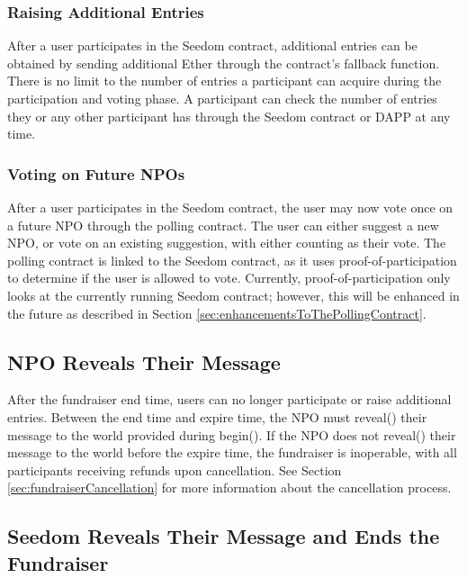 \documentclass[11pt]{article}
\begin{document}
\subsubsection{Raising Additional Entries}

After a user participates in the Seedom contract, additional entries can be obtained by sending additional Ether through the contract's fallback function. There is no limit to the number of entries a participant can acquire during the participation and voting phase. A participant can check the number of entries they or any other participant has through the Seedom contract or DAPP at any time.

\subsubsection{Voting on Future NPOs}

After a user participates in the Seedom contract, the user may now vote once on a future NPO through the polling contract. The user can either suggest a new NPO, or vote on an existing suggestion, with either counting as their vote. The polling contract is linked to the Seedom contract, as it uses proof-of-participation to determine if the user is allowed to vote. Currently, proof-of-participation only looks at the currently running Seedom contract; however, this will be enhanced in the future as described in Section \ref{sec:enhancementsToThePollingContract}.

\subsection{NPO Reveals Their Message}

After the fundraiser end time, users can no longer participate or raise additional entries. Between the end time and expire time, the NPO must reveal() their message to the world provided during begin(). If the NPO does not reveal() their message to the world before the expire time, the fundraiser is inoperable, with all participants receiving refunds upon cancellation. See Section \ref{sec:fundraiserCancellation} for more information about the cancellation process.

\subsection{Seedom Reveals Their Message and Ends the Fundraiser}
\label{sec:seedomRevealsTheirMessageAndEndsTheFundraiser}
\end{document}

